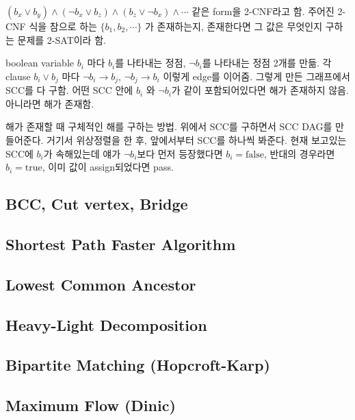 \documentclass[10pt,landscape,a4paper,twocolumn]{article}
\begin{document}
$(b_{x} \lor b_{y}) \land (\neg b_{x} \lor b_{z}) \land (b_{z} \lor \neg b_{x}) \land \cdots$ 같은 form을 2-CNF라고 함. 주어진 2-CNF 식을 참으로 하는 $\{ b_1, b_2, \cdots \}$ 가 존재하는지, 존재한다면 그 값은 무엇인지 구하는 문제를 2-SAT이라 함.

boolean variable $b_{i}$ 마다 $b_{i}$를 나타내는 정점, $\neg b_{i} $를 나타내는 정점 2개를 만듦. 각 clause $b_{i} \lor b_{j}$ 마다 $\neg b_{i} \to b_{j}$, $\neg b_{j} \to b_{i}$ 이렇게 edge를 이어줌. 그렇게 만든 그래프에서 SCC를 다 구함. 어떤 SCC 안에 $b_{i}$ 와 $\neg b_{i}$가 같이 포함되어있다면 해가 존재하지 않음. 아니라면 해가 존재함.

해가 존재할 때 구체적인 해를 구하는 방법. 위에서 SCC를 구하면서 SCC DAG를 만들어준다. 거기서 위상정렬을 한 후, 앞에서부터 SCC를 하나씩 봐준다. 현재 보고있는 SCC에 $b_{i}$가 속해있는데 얘가 $\neg b_{i}$보다 먼저 등장했다면 $b_{i} = \mathrm{false}$, 반대의 경우라면 $b_{i} = \mathrm{true}$, 이미 값이 assign되었다면 pass.

\subsection{BCC, Cut vertex, Bridge}


\subsection{Shortest Path Faster Algorithm}


\subsection{Lowest Common Ancestor}


\subsection{Heavy-Light Decomposition}


\subsection{Bipartite Matching (Hopcroft-Karp)}


\subsection{Maximum Flow (Dinic)}

\end{document}
